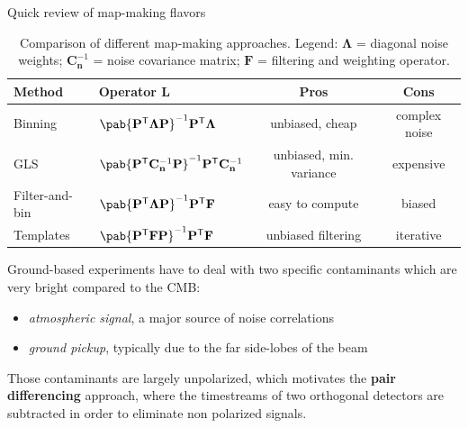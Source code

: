 \documentclass[final]{beamer}
\newcommand{\transpose}[1]{\ensuremath{#1^{\mathsf T}}}
\newlength{\colwidth}
\begin{document}
\begin{frame}[t]
\begin{columns}[t]
\begin{column}{\colwidth}
\begin{alertblock}{Quick review of map-making flavors}
        \begin{table}
          \centering
          \begin{tabular}{l l c c}
            \toprule
            \textbf{Method} & \textbf{Operator} \(\mathbf L\)                                                                                              & \textbf{Pros}           & \textbf{Cons} \\
            \midrule
            Binning         & \( \pab{\transpose{\mathbf P} \mathbf{\Lambda P}}^{-1} \transpose{\mathbf P} \mathbf \Lambda \)                              & unbiased, cheap         & complex noise \\
            \midrule
            GLS             & \( \pab{\transpose{\mathbf P} \mathbf{C}_\mathbf{n}^{-1} \mathbf P}^{-1} \transpose{\mathbf P} \mathbf{C}_\mathbf{n}^{-1} \) & unbiased, min. variance & expensive     \\
            \midrule
            Filter-and-bin  & \( \pab{\transpose{\mathbf P} \mathbf{\Lambda P}}^{-1} \transpose{\mathbf P} \mathbf F \)                                    & easy to compute         & biased        \\
            \midrule
            Templates       & \( \pab{\transpose{\mathbf P} \mathbf{F P}}^{-1} \transpose{\mathbf P} \mathbf F \)                                          & unbiased filtering      & iterative     \\
            \bottomrule
          \end{tabular}
          \caption{Comparison of different map-making approaches. Legend: \(\mathbf \Lambda\) = diagonal noise weights; \(\mathbf{C}_\mathbf{n}^{-1}\) = noise covariance matrix; \(\mathbf F\) = filtering and weighting operator.}
        \end{table}


        Ground-based experiments have to deal with two specific contaminants which are very bright compared to the CMB:

        \begin{itemize}
          \item \emph{atmospheric signal}, a major source of noise correlations
          \item \emph{ground pickup}, typically due to the far side-lobes of the beam
        \end{itemize}

        Those contaminants are largely unpolarized, which motivates the \textbf{pair differencing} approach, where the timestreams of two orthogonal detectors are subtracted in order to eliminate non polarized signals.


\end{alertblock}
\end{column}
\end{columns}
\end{frame}
\end{document}

